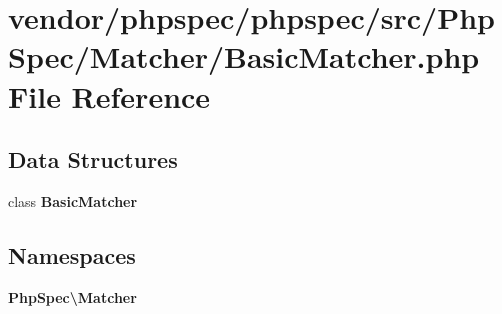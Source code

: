 \section{vendor/phpspec/phpspec/src/\+Php\+Spec/\+Matcher/\+Basic\+Matcher.php File Reference}
\label{_basic_matcher_8php}
\subsection*{Data Structures}
\begin{DoxyCompactItemize}
\item 
class {\bf Basic\+Matcher}
\end{DoxyCompactItemize}
\subsection*{Namespaces}
\begin{DoxyCompactItemize}
\item 
 {\bf Php\+Spec\textbackslash{}\+Matcher}
\end{DoxyCompactItemize}
